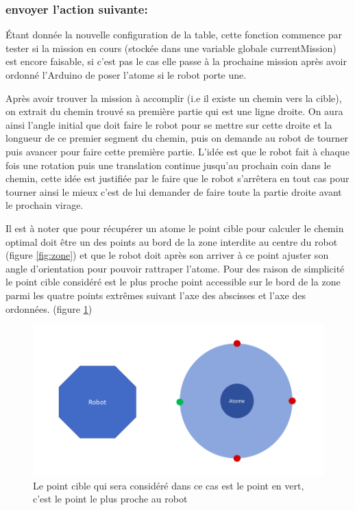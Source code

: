 \documentclass{article}
\begin{document}
\subsubsection{envoyer l'action suivante:}

Étant donnée la nouvelle configuration de la table, cette fonction commence par tester si la mission en cours (stockée dans une variable globale currentMission) est encore faisable, si c'est pas le cas elle passe à la prochaine mission après avoir ordonné l'Arduino de poser l'atome si le robot porte une.

Après avoir trouver la mission à accomplir (i.e il existe un chemin vers la cible), on extrait du chemin trouvé sa première partie qui est une ligne droite. On aura ainsi l'angle initial que doit faire le robot pour se mettre sur cette droite et la longueur de ce premier segment du chemin, puis on demande au robot de tourner puis avancer pour faire cette première partie. L'idée est que le robot fait à chaque fois une rotation puis une translation continue jusqu'au prochain coin dans le chemin, cette idée est justifiée par le faire que le robot s'arrêtera en tout cas pour tourner ainsi le mieux c'est de lui demander de faire toute la partie droite avant le prochain virage.

Il est à noter que pour récupérer un atome le point cible pour calculer le chemin optimal doit être un des points au bord de la zone interdite au centre du robot (figure \ref{fig:zone}) et que le robot doit après son arriver à ce point ajuster son angle d'orientation pour pouvoir rattraper l'atome. Pour des raison de simplicité le point cible considéré est le plus proche point accessible sur le bord de la zone parmi les quatre points extrêmes suivant l'axe des abscisses et l'axe des ordonnées. (figure \ref{fig:pointsAcc})

\begin{figure}[!h]
\centering
\includegraphics[scale=0.4]{pointAcc}
\caption{Le point cible qui sera considéré dans ce cas est le point en vert, c'est le point le plus proche au robot}
\label{fig:pointsAcc}
\end{figure}
\end{document}
